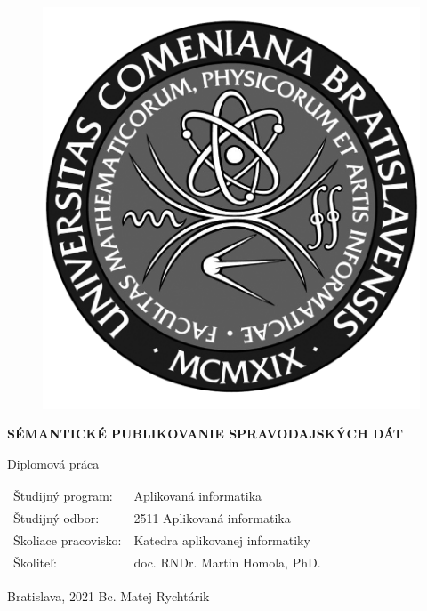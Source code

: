 \documentclass[12pt, a4paper, oneside]{book}
\newcommand\mftitle{Sémantické publikovanie spravodajských dát}
\newcommand\mfthesistype{Diplomová práca}
\newcommand\mfauthor{Bc. Matej Rychtárik}
\newcommand\mfadvisor{doc. RNDr. Martin Homola, PhD.}
\newcommand\mfplacedate{Bratislava, 2021}
\begin{document}
\vfill
\begin{figure}[!hbt]
\begin{center}
\includegraphics{images/logo_fmph_dark}
\label{img:logo_dark}
\end{center}
\end{figure}
\begin{center}
\begin{minipage}{0.8\textwidth}
\centerline{\textbf{\Large\MakeUppercase{\mftitle}}}
\smallskip
\centerline{\mfthesistype}
\end{minipage}
\end{center}
\vfill
\begin{tabular}{l l}
Študijný program: & Aplikovaná informatika\\
Študijný odbor: & 2511 Aplikovaná informatika\\
Školiace pracovisko: & Katedra aplikovanej informatiky\\
Školiteľ: & \mfadvisor
\end{tabular}
\vfill
\noindent
\mfplacedate \hfill
\mfauthor
\eject 

\end{document}
